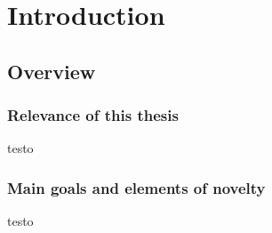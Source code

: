 \setchapterpreamble[u]{\margintoc}
\chapter{Introduction}

\section{Overview} 

\subsection{Relevance of this thesis}

testo 



\subsection{Main goals and elements of novelty}
testo



